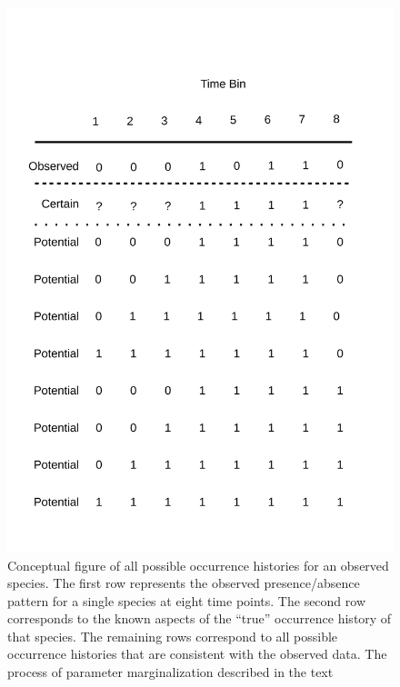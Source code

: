 \documentclass[12pt,letterpaper]{article}
\begin{document}
\begin{figure}[ht]
  \centering
  \includegraphics[height=0.4\textheight, width=\textwidth, keepaspectratio=true]{figure/margin}
  \caption[Conceptual figure of all possible occurrence histories for an observed species]{Conceptual figure of all possible occurrence histories for an observed species. The first row represents the observed presence/absence pattern for a single species at eight time points. The second row corresponds to the known aspects of the ``true'' occurrence history of that species. The remaining rows correspond to all possible occurrence histories that are consistent with the observed data. The process of parameter marginalization described in the text}
  \label{fig:margin_concept}
\end{figure}


\end{document}
